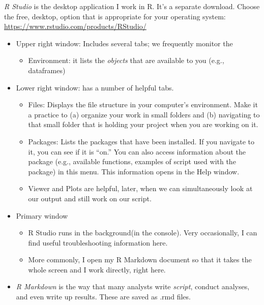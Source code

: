 \documentclass[
  english,
]{book}
\providecommand{\tightlist}{%
  \setlength{\itemsep}{0pt}\setlength{\parskip}{0pt}}
\begin{document}
\emph{R Studio} is the desktop application I work in R. It's a separate download. Choose the free, desktop, option that is appropriate for your operating system: \url{https://www.rstudio.com/products/RStudio/}

\begin{itemize}
\tightlist
\item
  Upper right window: Includes several tabs; we frequently monitor the

  \begin{itemize}
  \tightlist
  \item
    Environment: it lists the \emph{objects} that are available to you (e.g., dataframes)
  \end{itemize}
\item
  Lower right window: has a number of helpful tabs.

  \begin{itemize}
  \tightlist
  \item
    Files: Displays the file structure in your computer's environment. Make it a practice to (a) organize your work in small folders and (b) navigating to that small folder that is holding your project when you are working on it.
  \item
    Packages: Lists the packages that have been installed. If you navigate to it, you can see if it is ``on.'' You can also access information about the package (e.g., available functions, examples of script used with the package) in this menu. This information opens in the Help window.
  \item
    Viewer and Plots are helpful, later, when we can simultaneously look at our output and still work on our script.
  \end{itemize}
\item
  Primary window

  \begin{itemize}
  \tightlist
  \item
    R Studio runs in the background(in the console). Very occasionally, I can find useful troubleshooting information here.
  \item
    More commonly, I open my R Markdown document so that it takes the whole screen and I work directly, right here.
  \end{itemize}
\item
  \emph{R Markdown} is the way that many analysts write \emph{script}, conduct analyses, and even write up results. These are saved as .rmd files.


\end{itemize}
\end{document}

